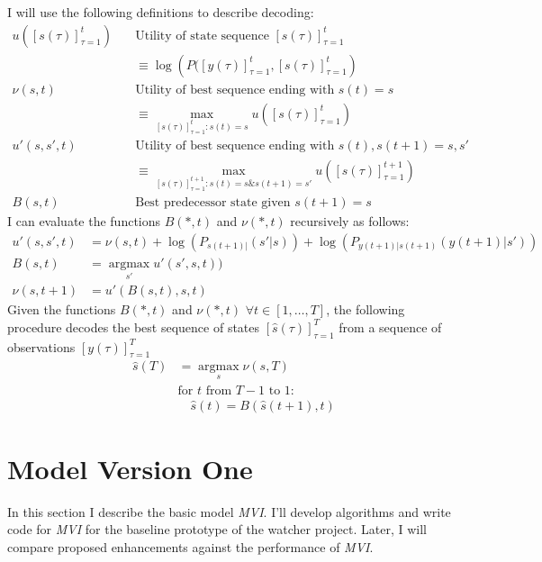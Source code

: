 \documentclass[12pt]{article}
\newcommand{\os}[4]{{\left[ #1(#2) \right]}_{#3}^{#4}} %
\newcommand{\ti}[2]{{#1}{(#2)}}                         %
\newcommand{\ts}[4]{\os{#1}{#2}{#2=#3}{#4}} %
\newcommand{\argmax}{\operatorname*{argmax}}
\begin{document}
I will use the following definitions to describe decoding:
\begin{align*}
  u(\ts{s}{\tau}{1}{t}) & \quad \text{Utility of state sequence }
  \ts{s}{\tau}{1}{t}\\
  & \quad \equiv \log \left( P(\ts{y}{\tau}{1}{t},\ts{s}{\tau}{1}{t} \right)
  \\
  \nu(s,t) & \quad \text{Utility of best sequence ending with }
  \ti{s}{t} = s \\ 
  &  \quad \equiv \max_{\ts{s}{\tau}{1}{t}:\ti{s}{t}=s} u(\ts{s}{\tau}{1}{t}) \\
  u'(s,s',t) & \quad \text{Utility of best sequence ending with }
  \ti{s}{t},\ti{s}{t+1} = s,s' \\
  &  \quad \equiv \max_{\ts{s}{\tau}{1}{t+1}:\ti{s}{t}=s \&\ti{s}{t+1}=s'}
  u(\ts{s}{\tau}{1}{t+1}) \\
  B(s,t) & \quad \text{Best predecessor state given } \ti{s}{t+1}=s   
\end{align*}
I can evaluate the functions $B(*,t)$ and $\nu(*,t)$ recursively as
follows:
\begin{align*}
  u'(s,s',t) &= \nu(s,t) + \log\left( P_{\ti{s}{t+1}|}(s'|s) \right) +
  \log\left( P_{\ti{y}{t+1}|\ti{s}{t+1}}(\ti{y}{t+1}|s') \right) \\
  B(s,t) &= \argmax_{s'} u'(s',s,t)) \\
  \nu(s,t+1) &= u'(B(s,t),s,t)
\end{align*}
Given the functions $B(*,t)$ and $\nu(*,t)$ $\forall
t\in[1,\ldots,T]$, the following procedure decodes the best sequence
of states $ \ts{\hat s}{\tau}{1}{T}$ from a sequence of observations $
\ts{y}{\tau}{1}{T}$
\begin{align*}
  {\ti{{\hat s}}{T}} &= \argmax_s \nu(s,T) \\
  & \text{for } t \text{ from } T-1 \text{ to } 1: \\
  & \quad \ti{\hat s}{t} = B( \ti{\hat s}{t+1},t)
\end{align*}

\section{Model Version One}
\label{sec:model1}

In this section I describe the basic model \emph{MVI}.  I'll develop
algorithms and write code for \emph{MVI} for the baseline prototype of
the watcher project.  Later, I will compare proposed enhancements
against the performance of \emph{MVI}.
\end{document}
